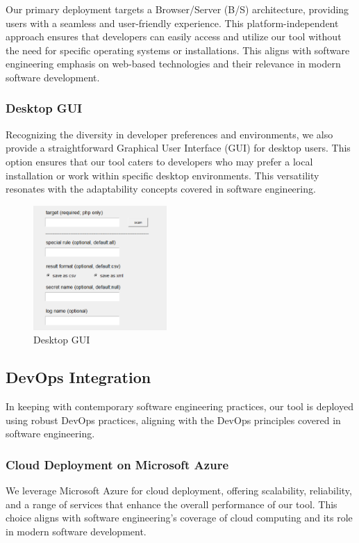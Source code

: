 \documentclass[journal]{IEEEtran}
\begin{document}
Our primary deployment targets a Browser/Server (B/S) architecture, providing users with a seamless and user-friendly experience. This platform-independent approach ensures that developers can easily access and utilize our tool without the need for specific operating systems or installations. This aligns with software engineering emphasis on web-based technologies and their relevance in modern software development.

\subsubsection{Desktop GUI}

Recognizing the diversity in developer preferences and environments, we also provide a straightforward Graphical User Interface (GUI) for desktop users. This option ensures that our tool caters to developers who may prefer a local installation or work within specific desktop environments. This versatility resonates with the adaptability concepts covered in software engineering.
\begin{figure}[h]
\centering
\includegraphics[width=2in]{figures/guimulti.png}
\caption{Desktop GUI}
\label{fig:guimul}
\end{figure}


\subsection{DevOps Integration}
\label{sol:devops}

In keeping with contemporary software engineering practices, our tool is deployed using robust DevOps practices, aligning with the DevOps principles covered in software engineering.

\subsubsection{Cloud Deployment on Microsoft Azure}

We leverage Microsoft Azure for cloud deployment, offering scalability, reliability, and a range of services that enhance the overall performance of our tool. This choice aligns with software engineering's coverage of cloud computing and its role in modern software development.
\end{document}
